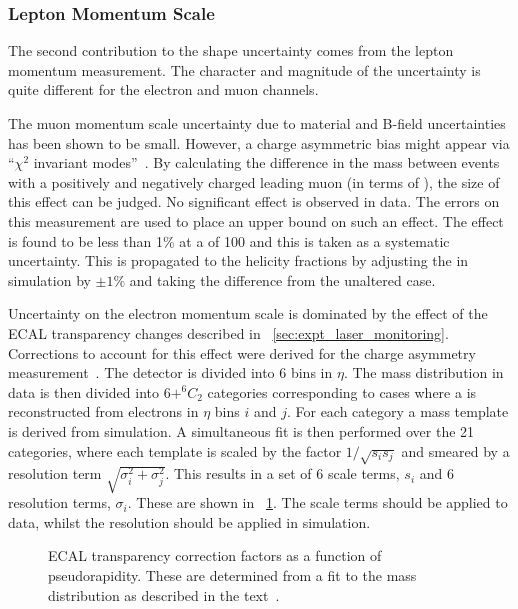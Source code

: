 \subsubsection{Lepton Momentum Scale}
The second contribution to the \LP shape uncertainty comes from the lepton
momentum measurement. The character and magnitude of the uncertainty is quite
different for the electron and muon channels.

The muon momentum scale uncertainty due to material and B-field uncertainties
has been shown to be small. However, a charge asymmetric \Pt bias might appear
via ``$\chi^2$ invariant modes''~\cite[section
2.4]{matthias_edelhoff_thesis}. By calculating the difference in the \PZ mass
between events with a positively and negatively charged leading muon (in terms
of \Pt), the size of this effect can be judged. No significant effect is
observed in data. The errors on this measurement are used to place an upper
bound on such an effect. The effect is found to be less than 1\% at a \Ptmu of
\unit{100}{\GeV} and this is taken as a systematic uncertainty. This is
propagated to the helicity fractions by adjusting the \Ptmu in simulation by
$\pm 1\%$ and taking the difference from the unaltered case.

Uncertainty on the electron momentum scale is dominated by the effect of the
\ac{ECAL} transparency changes described in
\sec~\ref{sec:expt_laser_monitoring}. Corrections to account for this effect
were derived for the \PW charge asymmetry
measurement~\cite{w_charge_asymmetry}. The detector is divided into 6 bins in
$\eta$. The \Zee mass distribution in data is then divided into $6 + ^6C_2$
categories corresponding to cases where a \PZ is reconstructed from electrons in
$\eta$ bins $i$ and $j$.  For each category a mass template is derived from
simulation. A simultaneous fit is then performed over the 21 categories, where
each template is scaled by the factor $1/\sqrt{s_is_j}$ and smeared by a
resolution term $\sqrt{\sigma_i^2 + \sigma_j^2}$. This results in a set of 6
scale terms, $s_i$ and 6 resolution terms, $\sigma_i$. These are shown in
\fig~\ref{fig:wpol_ecal_transp_corr}.  The scale terms should be applied to
data, whilst the resolution should be applied in simulation.

\begin{figure}
  \centering
  \quad
  \quad
  \caption{\ac{ECAL} transparency correction factors as a function of
    pseudorapidity. These are determined from a fit to the \PZ mass distribution
    as described in the text~\cite{w_charge_asymmetry_an}.}
\label{fig:wpol_ecal_transp_corr}
\end{figure}

